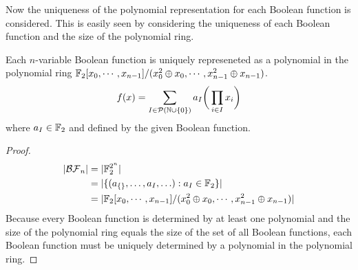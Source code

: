 \par Now the uniqueness of the polynomial representation for each Boolean
function is considered. This is easily seen by considering the uniqueness of
each Boolean function and the size of the polynomial ring.

\begin{theorem}
Each $n$-variable Boolean function is uniquely represeneted as a polynomial
in the polynomial ring $\mathbb{F}_2[x_0,\cdots,x_{n-1}]/ (x_0^2\oplus x_0,\cdots,
x_{n-1}^2 \oplus x_{n-1})$.
\begin{equation}\label{eqn:ANF}
  f(x)=\sum_{I\in\mathcal{P}(\mathbb{N}\cup\{0\})}a_I\bigg(\prod_{i\in I}x_i\bigg)
\end{equation}
where $a_I\in\mathbb{F}_2$ and defined by the given Boolean function.
\end{theorem}

\begin{proof}
  \begin{align*}
  \lvert\mathcal{BF}_n\rvert
    &= \lvert \mathbb{F}_2^{2^n} \rvert \\
    &= \lvert \{(a_{\{\}},\ldots,a_I,\ldots):a_I\in\mathbb{F}_2\} \rvert \\
    &= \lvert \mathbb{F}_2[x_0,\cdots,x_{n-1}]/ (x_0^2\oplus x_0,\cdots,
    x_{n-1}^2 \oplus x_{n-1})\rvert
  \end{align*}
  Because every Boolean function is determined by at least one polynomial
  and the size of the polynomial ring equals the size of the set of all
  Boolean functions, each Boolean function must be uniquely determined by a
  polynomial in the polynomial ring.
\end{proof}
